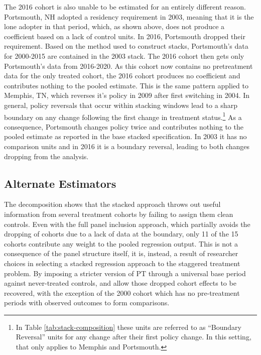 \documentclass[12pt]{article}
\begin{document}
The 2016 cohort is also unable to be estimated for an entirely different reason. Portsmouth, NH adopted a residency requirement in 2003, meaning that it is the lone adopter in that period, which, as shown above, does not produce a coefficient based on a lack of control units. In 2016, Portsmouth dropped their requirement. Based on the method used to construct stacks, Portsmouth's data for 2000-2015 are contained in the 2003 stack. The 2016 cohort then gets only Portsmouth's data from 2016-2020. As this cohort now contains no pretreatment data for the only treated cohort, the 2016 cohort produces no coefficient and contributes nothing to the pooled estimate. This is the same pattern applied to Memphis, TN, which reverses it's policy in 2009 after first switching in 2004. In general, policy reversals that occur within stacking windows lead to a sharp boundary on any change following the first change in treatment status.\footnote{In Table \ref{tab:stack-composition} these units are referred to as ``Boundary Reversal'' units for any change after their first policy change. In this setting, that only applies to Memphis and Portsmouth.} As a consequence, Portsmouth changes policy twice and contributes nothing to the pooled estimate as reported in the base stacked specification. In 2003 it has no comparison units and in 2016 it is a boundary reversal, leading to both changes dropping from the analysis.

\subsection{Alternate Estimators}

The decomposition shows that the stacked approach throws out useful information from several treatment cohorts by failing to assign them clean controls. Even with the full panel inclusion approach, which partially avoids the dropping of cohorts due to a lack of data at the boundary, only 11 of the 15 cohorts contribute any weight to the pooled regression output. This is not a consequence of the panel structure itself, it is, instead, a result of researcher choices in selecting a stacked regression approach to the staggered treatment problem. By imposing a stricter version of PT through a universal base period against never-treated controls, \textcite{callaway2021difference} and \textcite{sun2021estimating} allow those dropped cohort effects to be recovered, with the exception of the 2000 cohort which has no pre-treatment periods with observed outcomes to form comparisons.
\end{document}
